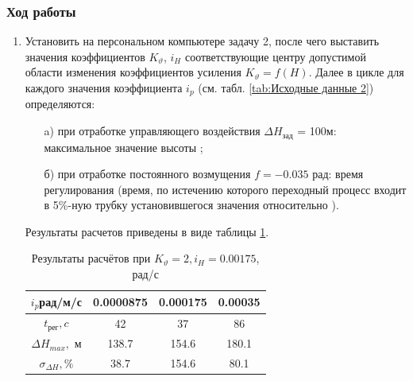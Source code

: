 \documentclass[a4paper,12pt]{article}
\begin{document}
        \subsubsection{Ход работы}
            	\begin{enumerate}
		            \item Установить на персональном компьютере задачу 2, после чего выставить
                        значения коэффициентов $K_{\vartheta}$, $i_H$ соответствующие центру допустимой
                        области изменения коэффициентов усиления $K_{\vartheta}=f(H)$. Далее в цикле для
                        каждого значения коэффициента  $i_p$ (см. табл. \ref{tab:Исходные данные 2}) определяются:
                            \begin{itemize}
                                \item[a)] при отработке управляющего воздействия $\Delta H_{зад}$ = 100м:
                                        максимальное значение высоты ;
                                \item[б)] при отработке постоянного возмущения  $f=-0.035$ рад:
                                время регулирования   (время, по истечению которого переходный процесс  входит в 5\%-ную трубку установившегося значения
                                относительно ).
                            \end{itemize}
                            Результаты расчетов приведены в виде таблицы \ref{tab:Таблица с результатами лаба2}.
                            
                            \begin{table}[H]
                                \centering
                                \caption{Результаты расчётов при $K_{\vartheta}=2, i_H=0.00175$, рад/с}
                                \begin{tabular}{|c|c|c|c|}
                                \hline
                                    $i_p$рад/м/с & 0.0000875 & 0.000175 &0.00035\\ \hline
                                    $t_{\text{рег}}, c$ & 42 & 37 &86\\ \hline
                                    $\Delta H_{max},$ м &  138.7  & 154.6 & 180.1 \\ \hline
                                    $\sigma_{\Delta H}, \%$  & 38.7  & 154.6  &  80.1 \\ \hline
                                \end{tabular}
                                \label{tab:Таблица с результатами лаба2}
                            \end{table}
                            

\end{enumerate}
\end{document}
